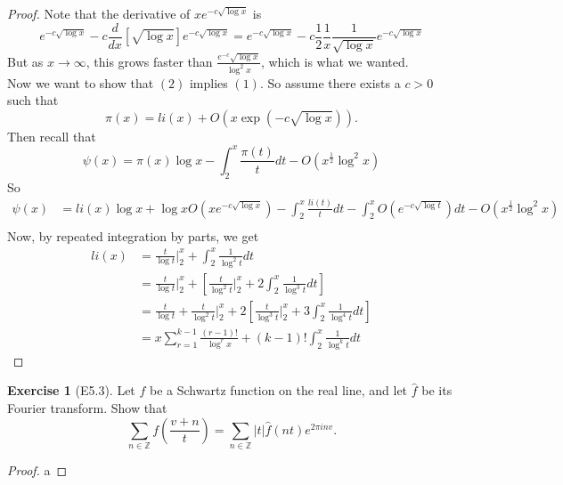 \documentclass[reqno]{amsart}
\theoremstyle{definition}
\newtheorem{exercise}[theorem]{Exercise}
\theoremstyle{remark}
\begin{document}
\begin{proof}
Note that the derivative of
$x e^{-c \sqrt{\log x} }$ is 
\[
e^{-c \sqrt{\log x} } - c \frac{d}{dx} \left[ \sqrt{\log x} 
\right] e^{-c \sqrt{\log x} }
= e^{-c \sqrt{\log x} }
-c \frac{1}{2} \frac{1}{x} \frac{1}{\sqrt{\log x} }
e^{-c \sqrt{\log x } }
\] 
But as
$x \to \infty$, this grows
faster than
$\frac{e^{-c} \sqrt{\log x} }{\log^2 x}$, which
is what we wanted.\\
\linebreak
Now we want to show that
$(2)$ implies $(1)$. So assume
there exists a $c> 0$ such that
\[
\pi(x) = li(x) + O\left( x \exp\left( -c \sqrt{\log x} 
\right) \right) .
\] 
Then recall that
\[
\psi (x) = 
\pi(x) \log x - \int_{2}^{x} \frac{\pi(t)}{t} dt
- O\left( x^{\frac{1}{2}} \log^2 x \right) 
\] 
So
\begin{align*}
    \psi (x)
    &= li(x) \log x + \log x O\left( xe^{-c \sqrt{\log x} } \right) 
    - \int_{2}^{x} \frac{li (t)}{t} dt
    - \int_{2}^{x} O\left( e^{-c \sqrt{\log t} } \right)dt
    - O\left( x^{\frac{1}{2}} \log^2 x \right) \\
\end{align*}
Now, by repeated integration by parts, we get
\begin{align*}
    li(x) 
    &= \frac{t}{\log t} \bigg|_{2}^{x}
    + \int_{2}^{x} \frac{1}{\log^2 t} dt\\
    &= \frac{t}{\log t}\bigg|_{2}^{x}
    + \left[ \frac{t}{\log^2 t} \bigg|_{2}^{x}
    + 2 \int_{2}^{x} \frac{1}{\log^3 t}dt \right] \\
    &= \frac{t}{\log t} + \frac{t}{\log^2 t}\bigg|_{2}^{x}
    + 2 \left[ \frac{t}{\log^3 t} \bigg|_{2}^{x}
    +  3 \int_{2}^{x} \frac{1}{\log^{4} t} dt  \right] \\
    &= x \sum_{r=1}^{k-1} \frac{(r-1)!}{\log^{r} x}
    + (k-1)! \int_{2}^{x}  \frac{1}{\log^{k} t} dt 
\end{align*}

\end{proof}




\begin{exercise}[E5.3]
    Let $f$ be a Schwartz function on the real line, and
    let $\hat{f}$ be its Fourier transform. Show that
    \[
        \sum_{n \in \mathbb{Z}} f \left( \frac{v+n}{t} \right) 
    = \sum_{n \in \mathbb{Z}} \left| t \right| 
    \hat{f}\left( nt \right) e^{2 \pi i n v}.
\]
\end{exercise}

\begin{proof}
    a
\end{proof}




\end{document}
